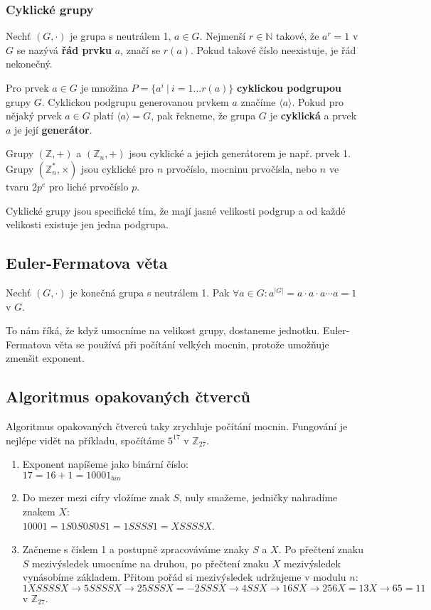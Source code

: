 \documentclass[10pt,a4paper]{article}
\begin{document}
\subsubsection{Cyklické grupy}

Nechť $(G,\cdot)$ je grupa s neutrálem 1, $a \in G$. Nejmenší $r \in \mathbb{N}$ takové, že $a^r = 1$ v $G$ se nazývá \textbf{řád prvku} $a$, značí se $r(a)$. Pokud takové číslo neexistuje, je řád nekonečný.

Pro prvek $a \in G$ je množina $P = \{a^i~|~i = 1 \ldots r(a)\}$ \textbf{cyklickou podgrupou} grupy $G$. Cyklickou podgrupu generovanou prvkem $a$ značíme $\langle a \rangle$. Pokud pro nějaký prvek $a \in G$ platí $\langle a \rangle  = G$, pak řekneme, že grupa $G$ je \textbf{cyklická} a prvek $a$ je její \textbf{generátor}.

Grupy $(\mathbb{Z}, +)$ a $(\mathbb{Z}_n, +)$ jsou cyklické a jejich generátorem je např. prvek 1. Grupy $(\mathbb{Z}_n^*, \times)$ jsou cyklické pro $n$ prvočíslo, mocninu prvočísla, nebo $n$ ve tvaru $2p^e$ pro liché prvočíslo $p$.

Cyklické grupy jsou specifické tím, že mají jasné velikosti podgrup a od každé velikosti existuje jen jedna podgrupa.

\subsection{Euler-Fermatova věta}
Nechť $(G,\cdot)$ je konečná grupa s neutrálem 1. Pak $\forall a \in G: a^{|G|} = a\cdot a\cdot a\cdots a = 1$ v $G$.

To nám říká, že když umocníme na velikost grupy, dostaneme jednotku. 
Euler-Fermatova věta se používá při počítání velkých mocnin, protože umožňuje zmenšit exponent.

\subsection{Algoritmus opakovaných čtverců}
Algoritmus opakovaných čtverců taky zrychluje počítání mocnin. Fungování je nejlépe vidět na příkladu, spočítáme $5^{17}$ v $\mathbb{Z}_{27}$.
\begin{enumerate}
\item Exponent napíšeme jako binární číslo:\\ $17 = 16 + 1 = 10001_{bin}$
\item Do mezer mezi cifry vložíme znak $S$, nuly smažeme, jedničky nahradíme znakem $X$:\\ $10001 = 1S0S0S0S1 = 1SSSS1 = XSSSSX$.
\item Začneme s číslem 1 a postupně zpracováváme znaky $S$ a $X$. Po přečtení znaku $S$ mezivýsledek umocníme na druhou, po přečtení znaku $X$ mezivýsledek vynásobíme základem. Přitom pořád si mezivýsledek udržujeme v modulu $n$:\\ $1XSSSSX \rightarrow 5SSSSX \rightarrow 25SSSX = -2SSSX \rightarrow 4SSX \rightarrow 16SX \rightarrow 256X = 13X \rightarrow 65 = 11$ v $\mathbb{Z}_{27}$.
\end{enumerate}
\end{document}
